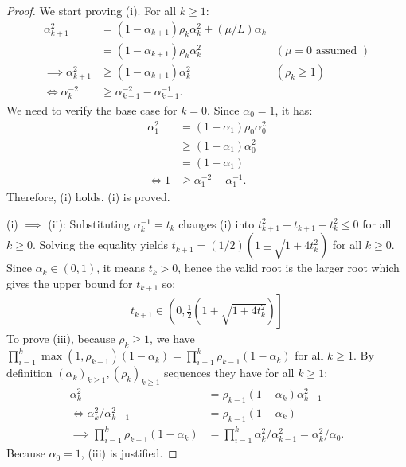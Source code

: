 \documentclass[12pt]{article}
\begin{document}
    \begin{proof}
        We start proving (i).
        For all $k \ge 1$:
        \begin{align*}
            \alpha_{k + 1}^2
            &= (1 - \alpha_{k + 1})\rho_k\alpha_k^2 + (\mu/L) \alpha_k
            \\
            &= (1 - \alpha_{k + 1})\rho_k\alpha_k^2 &
            (\mu = 0 \text{ assumed } )
            \\
            \implies
            \alpha_{k + 1}^2
            & \ge (1 - \alpha_{k + 1})\alpha_k^2
            &  (\rho_k \ge 1)
            \\
            \iff
            \alpha_k^{-2}
            &\ge
            \alpha_{k + 1}^{-2} - \alpha_{k + 1}^{-1}.
        \end{align*}
        We need to verify the base case for $k = 0$.
        Since $\alpha_0 = 1$, it has:
        \begin{align*}
            \alpha_1^2 &= (1 - \alpha_1)\rho_0\alpha_0^2
            \\
            &\ge (1 - \alpha_1)\alpha_0^2
            \\
            &= (1 - \alpha_1)
            \\
            \iff
            1 &\ge \alpha_1^{-2} - \alpha_1^{-1}.
        \end{align*}
        Therefore, (i) holds.
        (i) is proved.
        \par
        (i) $\implies$ (ii): Substituting $\alpha_k^{-1} = t_k$ changes (i) into $t_{k + 1}^2 - t_{k + 1} - t_{k}^2 \le 0$ for all $k \ge 0$.
        Solving the equality yields $t_{k + 1} = (1/2)\left(1 \pm \sqrt{1 + 4 t_k^2}\right)$ for all $k \ge 0$.
        Since $\alpha_k \in (0, 1)$, it means $t_k > 0$, hence the valid root is the larger root which gives the upper bound for $t_{k + 1}$ so:
        \begin{align*}
            t_{k + 1} \in \left(
                0, \frac{1}{2}\left(1 + \sqrt{1 + 4t_k^2}\right)
            \right]
        \end{align*}
        To prove (iii), because $\rho_k \ge 1$, we have $\prod_{i = 1}^{k} \max(1, \rho_{k - 1})(1 -
        \alpha_k)= \prod_{i = 1}^{k}\rho_{k - 1}(1 - \alpha_k)$ for all $k \ge 1 $.
        By definition $(\alpha_k)_{k \ge 1}, (\rho_k)_{k \ge 1}$ sequences they have for all $k \ge 1$:
        \begin{align*}
            \alpha_k^2 &= \rho_{k - 1}(1 - \alpha_k)\alpha_{k - 1}^2
            \\
            \iff
            \alpha_k^2/\alpha_{k - 1}^2 &= \rho_{k - 1}(1 - \alpha_k)
            \\
            \implies
            \prod_{i = 1}^{k}\rho_{k - 1}(1 - \alpha_k)
            &=
            \prod_{i = 1}^{k}\alpha_k^2 /\alpha_{k - 1}^2= \alpha_k^2/\alpha_0.
        \end{align*}
        Because $\alpha_0 = 1$, (iii) is justified.
    \end{proof}
\end{document}
